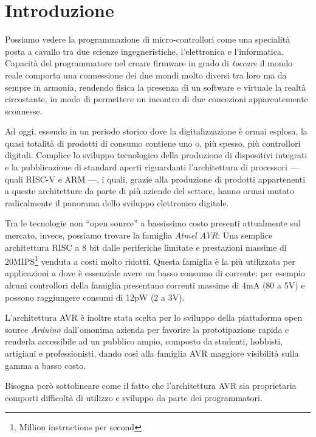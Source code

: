 \chapter{Introduzione}

Possiamo vedere la programmazione di micro-controllori come una specialità posta a cavallo tra due scienze ingegneristiche, l'elettronica e l'informatica.
Capacità del programmatore nel creare firmware in grado di \textit{toccare} il mondo reale comporta una connessione dei due mondi molto diversi tra loro ma da sempre in armonia, rendendo fisica la presenza di un software e virtuale la realtà circostante, in modo di permettere un incontro di due concezioni apparentemente sconnesse.

Ad oggi, essendo in un periodo storico dove la digitalizzazione è ormai esplosa, la quasi totalità di prodotti di consumo contiene uno o, più spesso, più controllori digitali.
Complice lo sviluppo tecnologico della produzione di dispositivi integrati e la pubblicazione di standard aperti riguardanti l'architettura di processori --- quali RISC-V e ARM\cite{site:arm-licensing} ---, i quali, grazie alla produzione di prodotti appartenenti a queste architetture da parte di più aziende del settore, hanno ormai mutato radicalmente il panorama dello sviluppo elettronico digitale.\cite{arm-intel-phone-market}\cite{site:arm-press-200b-chips}

Tra le tecnologie non ``open source'' a bassissimo costo presenti attualmente sul mercato, invece, possiamo trovare la famiglia \textit{Atmel AVR}: Una semplice architettura RISC a 8 bit dalle periferiche limitate e prestazioni massime di 20MIPS\footnote{Million instructions per second} venduta a costi molto ridotti.
Questa famiglia è la più utilizzata per applicazioni a dove è essenziale avere un basso consumo di corrente: per esempio alcuni controllori della famiglia presentano correnti massime di 4mA (80 a 5V) e possono raggiungere consumi di 12pW (2 a 3V)\cite{avr:tiny4}.

L'architettura AVR è inoltre stata scelta per lo sviluppo della piattaforma open source \textit{Arduino} dall'omonima azienda per favorire la prototipazione rapida e renderla accessibile ad un pubblico ampio, composto da studenti, hobbisti, artigiani e professionisti\cite{site:arduino-about}, dando così alla famiglia AVR maggiore visibilità sulla gamma a basso costo.

Bisogna però sottolineare come il fatto che l'architettura AVR sia proprietaria comporti difficoltà di utilizzo e sviluppo da parte dei programmatori.

